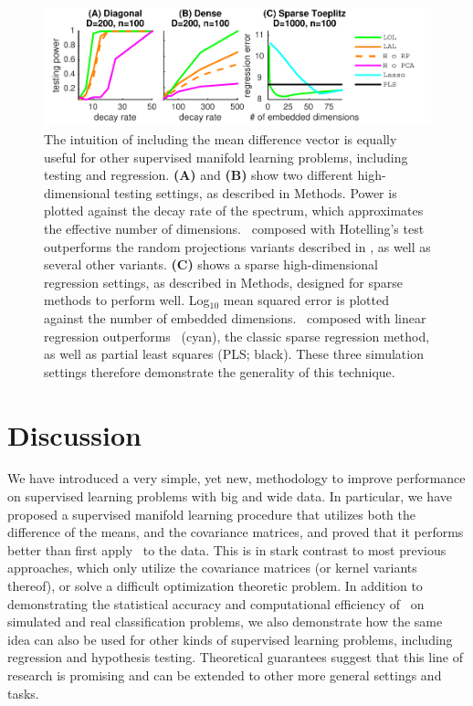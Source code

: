 \documentclass[10pt]{article}
\begin{document}
\begin{figure}
\centering
\includegraphics[width=1\linewidth]{../Figs/regression_power}
\caption{
The intuition of including the mean difference vector is equally useful for other supervised manifold learning problems, including testing and regression.
\textbf{(A)} and \textbf{(B)} show two different high-dimensional testing settings, as described in Methods.  Power is plotted against the decay rate of the spectrum, which approximates the effective number of dimensions.  \Lol~composed with Hotelling's test outperforms the random projections variants described in \cite{Lopes2011a}, as well as several other variants.
\textbf{(C)} shows a sparse high-dimensional regression settings, as described in Methods, designed for sparse methods to perform well.  Log$_{10}$ mean squared error is plotted against the number of embedded dimensions.
\Lol~composed with linear regression outperforms ~(cyan), the classic sparse regression method, as well as partial least squares (PLS; black).
These three simulation settings therefore demonstrate the generality of this technique.
}
\label{f:generalizations}
\end{figure}


\section*{Discussion}

We have introduced a very simple, yet new, methodology to improve performance on supervised learning problems with big and wide data.  In particular, we have proposed a supervised manifold learning procedure that utilizes both the difference of the means, and the covariance matrices, and proved that it performs better than first apply \Pca~to the data.  This is in stark contrast to most previous approaches, which only utilize the covariance matrices (or kernel variants thereof), or solve a difficult optimization theoretic problem.  In addition to demonstrating the statistical accuracy and computational efficiency of \Lol~on simulated and real classification problems, we also demonstrate how the same idea can also be used for other kinds of supervised learning problems, including regression and hypothesis testing. Theoretical guarantees suggest that this line of research is promising and can be extended to other more general settings and tasks.
\end{document}

